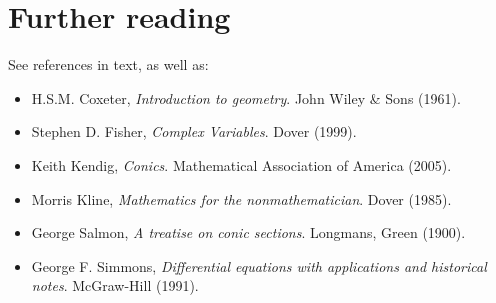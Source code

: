 \documentclass[a4paper,leqno,9pt]{article}
\theoremstyle{exercise}
\theoremstyle{plain}
\theoremstyle{definition}
\theoremstyle{remark}
\begin{document}
\section{Further reading}
See references in text, as well as:
\begin{itemize}
  \item H.S.M. Coxeter, \emph{Introduction to geometry}. John Wiley \& Sons (1961).
  \item Stephen D. Fisher, \emph{Complex Variables}. Dover (1999).
  \item Keith Kendig, \emph{Conics}. Mathematical Association of America (2005).
  \item Morris Kline, \emph{Mathematics for the nonmathematician}. Dover (1985).
  \item George Salmon, \emph{A treatise on conic sections}. Longmans, Green (1900).
  \item George F. Simmons, \emph{Differential equations with applications and historical notes}. McGraw-Hill (1991).
\end{itemize}
\end{document}

